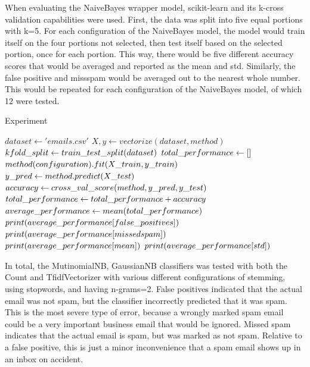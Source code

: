 \documentclass{article}
\begin{document}
\begin{paragraph}
When evaluating the NaiveBayes wrapper model, scikit-learn and its k-cross validation capabilities were used. First, the data was split into five equal portions with k=5. For each configuration of the NaiveBayes model, the model would train itself on the four portions not selected, then test itself based on the selected portion, once for each portion. This way, there would be five different accuracy scores that would be averaged and reported as the mean and std. Similarly, the false positive and missspam would be averaged out to the nearest whole number. This would be repeated for each configuration of the NaiveBayes model, of which 12 were tested. 


\begin{algorithm}[H]
\caption{Experiment}
\begin{algorithmic} 
\STATE $dataset \leftarrow 'emails.csv'$
    \STATE $X, y \leftarrow vectorize(dataset, method)$
    \STATE $kfold\char`_split \leftarrow train\char`_test\char`_split(dataset)$
    \STATE $total\char`_performance \leftarrow [ ]$
        \STATE $method(configuration).fit(X\char`_train, y\char`_train)$
        \STATE $y\char`_pred \leftarrow method.predict(X\char`_test)$
        \STATE $accuracy \leftarrow cross\char`_val\char`_score(method, y\char`_pred, y\char`_test)$
        \STATE $total\char`_performance \leftarrow total\char`_performance + accuracy$
    \ENDFOR
    \STATE $average\char`_performance \leftarrow mean(total\char`_performance)$
    \STATE $print(average\char`_performance[false\char`_positives])$
    \STATE $print(average\char`_performance[missed\char`spam])$
    \STATE $print(average\char`_performance[mean])$
    \STATE $print(average\char`_performance[std])$
\ENDFOR
\end{algorithmic}
\end{algorithm}
\end{paragraph}

\begin{paragraph}
In total, the MutinomialNB, GaussianNB classifiers was tested with both the Count and TfidfVectorizer with various different configurations of stemming, using stopwords, and having n-grams=2. False positives indicated that the actual email was not spam, but the classifier incorrectly predicted that it was spam. This is the most severe type of error, because a wrongly marked spam email could be a very important business email that would be ignored. Missed spam indicates that the actual email is spam, but was marked as not spam. Relative to a false positive, this is just a minor inconvenience that a spam email shows up in an inbox on accident.
\end{paragraph}
\end{document}
